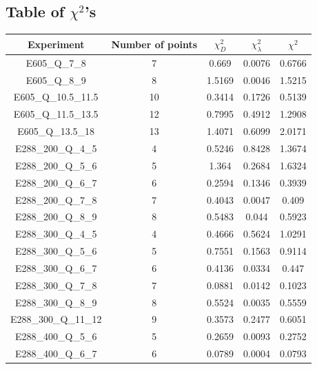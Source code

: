 \documentclass[
]{article}
\begin{document}
\hypertarget{table-of-chi2s}{%
\subsection{\texorpdfstring{Table of
\(\chi^2\)'s}{Table of \textbackslash chi\^{}2's}}\label{table-of-chi2s}}

\begin{table}[h]

\centering

\begin{tabular}{|c|c|c|c|c|} \hline

\textbf{Experiment} & \textbf{Number of
points} & \textbf{\(\chi_{D}^2\)} & \textbf{\(\chi_{\lambda}^2\)} & \textbf{\(\chi^2\)} \\ \hline

E605\_Q\_7\_8 & 7 & 0.669 & 0.0076 & 0.6766 \\ \hline
E605\_Q\_8\_9 & 8 & 1.5169 & 0.0046 & 1.5215 \\ \hline
E605\_Q\_10.5\_11.5 & 10 & 0.3414 & 0.1726 & 0.5139 \\ \hline
E605\_Q\_11.5\_13.5 & 12 & 0.7995 & 0.4912 & 1.2908 \\ \hline
E605\_Q\_13.5\_18 & 13 & 1.4071 & 0.6099 & 2.0171 \\ \hline
E288\_200\_Q\_4\_5 & 4 & 0.5246 & 0.8428 & 1.3674 \\ \hline
E288\_200\_Q\_5\_6 & 5 & 1.364 & 0.2684 & 1.6324 \\ \hline
E288\_200\_Q\_6\_7 & 6 & 0.2594 & 0.1346 & 0.3939 \\ \hline
E288\_200\_Q\_7\_8 & 7 & 0.4043 & 0.0047 & 0.409 \\ \hline
E288\_200\_Q\_8\_9 & 8 & 0.5483 & 0.044 & 0.5923 \\ \hline
E288\_300\_Q\_4\_5 & 4 & 0.4666 & 0.5624 & 1.0291 \\ \hline
E288\_300\_Q\_5\_6 & 5 & 0.7551 & 0.1563 & 0.9114 \\ \hline
E288\_300\_Q\_6\_7 & 6 & 0.4136 & 0.0334 & 0.447 \\ \hline
E288\_300\_Q\_7\_8 & 7 & 0.0881 & 0.0142 & 0.1023 \\ \hline
E288\_300\_Q\_8\_9 & 8 & 0.5524 & 0.0035 & 0.5559 \\ \hline
E288\_300\_Q\_11\_12 & 9 & 0.3573 & 0.2477 & 0.6051 \\ \hline
E288\_400\_Q\_5\_6 & 5 & 0.2659 & 0.0093 & 0.2752 \\ \hline
E288\_400\_Q\_6\_7 & 6 & 0.0789 & 0.0004 & 0.0793 \\ \hline

\end{tabular}
\end{table}
\end{document}
